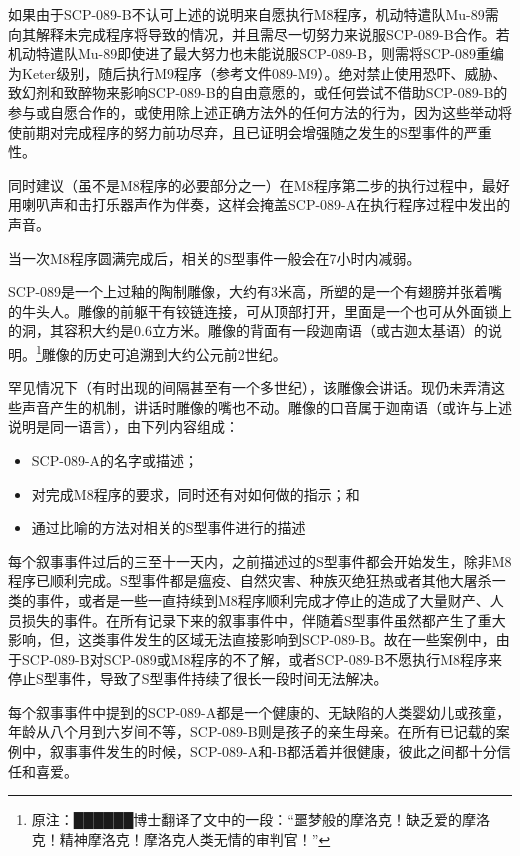 如果由于SCP-089-B不认可上述的说明来自愿执行M8程序，机动特遣队Mu-89需向其解释未完成程序将导致的情况，并且需尽一切努力来说服SCP-089-B合作。若机动特遣队Mu-89即使进了最大努力也未能说服SCP-089-B，则需将SCP-089重编为Keter级别，随后执行M9程序（参考文件089-M9）。绝对禁止使用恐吓、威胁、致幻剂和致醉物来影响SCP-089-B的自由意愿的，或任何尝试不借助SCP-089-B的参与或自愿合作的，或使用除上述正确方法外的任何方法的行为，因为这些举动将使前期对完成程序的努力前功尽弃，且已证明会增强随之发生的S型事件的严重性。

同时建议（虽不是M8程序的必要部分之一）在M8程序第二步的执行过程中，最好用喇叭声和击打乐器声作为伴奏，这样会掩盖SCP-089-A在执行程序过程中发出的声音。

当一次M8程序圆满完成后，相关的S型事件一般会在7小时内减弱。

SCP-089是一个上过釉的陶制雕像，大约有3米高，所塑的是一个有翅膀并张着嘴的牛头人。雕像的前躯干有铰链连接，可从顶部打开，里面是一个也可从外面锁上的洞，其容积大约是0.6立方米。雕像的背面有一段迦南语（或古迦太基语）的说明。\footnote{原注：██████博士翻译了文中的一段：“噩梦般的摩洛克！缺乏爱的摩洛克！精神摩洛克！摩洛克人类无情的审判官！”}雕像的历史可追溯到大约公元前2世纪。

罕见情况下（有时出现的间隔甚至有一个多世纪），该雕像会讲话。现仍未弄清这些声音产生的机制，讲话时雕像的嘴也不动。雕像的口音属于迦南语（或许与上述说明是同一语言），由下列内容组成：

\begin{itemize}
\item SCP-089-A的名字或描述；
\item 对完成M8程序的要求，同时还有对如何做的指示；和
\item 通过比喻的方法对相关的S型事件进行的描述
\end{itemize}

每个叙事事件过后的三至十一天内，之前描述过的S型事件都会开始发生，除非M8程序已顺利完成。S型事件都是瘟疫、自然灾害、种族灭绝狂热或者其他大屠杀一类的事件，或者是一些一直持续到M8程序顺利完成才停止的造成了大量财产、人员损失的事件。在所有记录下来的叙事事件中，伴随着S型事件虽然都产生了重大影响，但，这类事件发生的区域无法直接影响到SCP-089-B。故在一些案例中，由于SCP-089-B对SCP-089或M8程序的不了解，或者SCP-089-B不愿执行M8程序来停止S型事件，导致了S型事件持续了很长一段时间无法解决。

每个叙事事件中提到的SCP-089-A都是一个健康的、无缺陷的人类婴幼儿或孩童，年龄从八个月到六岁间不等，SCP-089-B则是孩子的亲生母亲。在所有已记载的案例中，叙事事件发生的时候，SCP-089-A和-B都活着并很健康，彼此之间都十分信任和喜爱。

